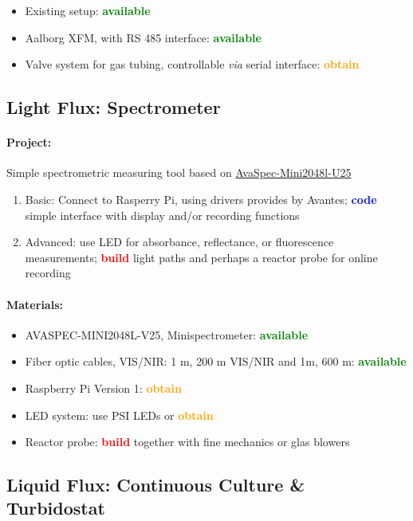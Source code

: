 \documentclass[12pt,a4paper]{scrartcl}
\newcommand{\obtain}[0]{\textcolor{orange}{\textbf{obtain}}}
\newcommand{\avail}[0]{\textcolor{green}{\textbf{available}}}
\newcommand{\build}[0]{\textcolor{red}{\textbf{build}}}
\newcommand{\code}[0]{\textcolor{blue}{\textbf{code}}}
\begin{document}
\begin{itemize}
\item Existing setup: \avail{}
\item Aalborg XFM, with RS 485 interface: \avail{}
\item Valve system for gas tubing, controllable \textit{via} serial
  interface: \obtain{}
\end{itemize}

\newpage
\subsection{Light Flux: Spectrometer} 
\label{spec}
\paragraph{Project:} 
Simple spectrometric measuring tool based on
\href{http://www.avantes.com/products/spectrometers/compactline/item/723-avaspec-mini}{AvaSpec-Mini2048l-U25}

\begin{enumerate}
\item Basic: Connect to Rasperry Pi, using drivers provides by
  Avantes; \code{} simple interface with display and/or recording
  functions
\item Advanced: use LED for absorbance, reflectance, or fluorescence
  measurements; \build{} light paths and perhaps a reactor probe for
  online recording
\end{enumerate}

\paragraph{Materials:}
\begin{itemize}
\item AVASPEC-MINI2048L-V25, Minispectrometer: \avail{}
\item Fiber optic cables, VIS/NIR: 1 m, 200 \textmu{}m VIS/NIR and 1m,
  600 \textmu{}m: \avail{}
\item Raspberry Pi Version 1: \obtain{}
\item LED system: use PSI LEDs or \obtain{}
\item Reactor probe: \build{} together with fine mechanics or glas
  blowers
\end{itemize}

\newpage
\subsection{Liquid Flux: Continuous Culture \& Turbidostat} 
\label{cult}
\end{document}
